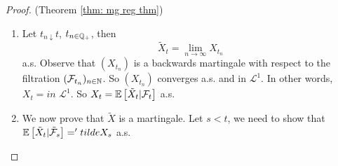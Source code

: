 \documentclass{article}
\begin{document}
\begin{proof}{(Theorem \ref{thm: mg reg thm})}
\begin{enumerate}
	 Let $ a<b$, $ a,b \in \Q_{+}$, $ I\subseteq \Q_{+}$, bounded. Observe that
	\[
		\mathcal{N}([a,b], I, X) = \displaystyle\sup_{I \subseteq I, J \text{ finite}} \mathcal{N}([a,b], J, X).
	\]
	Now, let $ J = \{j_{1}, \cdots, j_{n}\}\subseteq I$ with $ j_{1}<\cdots j_{n}$ and $ k>\displaystyle\sup I$. Then $ (X_{t})_{t\in J}$ is a discrete time martingale. Now, Doob's upcrossing inequality from \ref{lemma: doob upcrossing} gives
	\[
	\begin{array}{ll}
		(b-a)\cdot \mathbb{E}\left[ \mathcal{N}([a,b], J, X) \right] &\leq \mathbb{E}\left[ (X_{j_{n}}-a)^{-} \right] \\
	     &\leq \mathbb{E}\left[ (X_{k}-a)^{-} \right].
	\end{array}
	\]
	By monotone convergence, we get 
\[
(b-a)\cdot \mathbb{E}\left[ \mathcal{N}([a,b], I, X) \right]<\infty.
	\]
	Let $ M\in \N$, $ I_{M} = \Q_{+}\cap [0,M]$ and 
 \[
	 \Omega_{0} = \displaystyle\bigcap_{m\in\N} \left( \displaystyle\bigcap_{a<b, a,b\in\Q} \{ \mathcal{N}([a,b], I_{M}, X)<\infty\} \bigcup \left\{ \displaystyle\sup_{t\in I_{m}} |X_{t}|<\infty \right\}\right).
 \]
 On $ \Omega_{0}$, from lemma \ref{lemma: mg reg lemma}, $ \lim_{s \downarrow tX_{s}} $ exists and we have $\PP(\Omega_{0})=1$. Now, define 
 \[
	 \tilde{X}_{t} = \left\lbrace
\begin{array}{@{}l@{}}
	\lim_{s\downarrow t, s\in \Q_{+}} X_{s}, \quad \text{ on }\Omega_{0}    \\
	0 , \quad\quad\quad\quad\quad \text{ otherwise}. 
\end{array}\right. 
 \]
 Recall $ \tilde{\F}_{t} = \sigma(\F_{t}, \mathcal{N})$ for all $ t\geq 0$. From the definition definition, we see that $ \tilde{X}$ is $ \tilde{\F}-$adapted.\\ 

 It remains to show that $X_{t} =  \mathbb{E}\left[ \tilde{X}_{t}|\F_{t} \right]$ a.s. and $ \tilde{X}$ is cadlag and a martingale. 

\item Let $ t_{n\downarrow} t$, $ t_{n\in \mathbb{Q}_{+}}$, then 
	\[
		\tilde{X}_{t} = \lim_{n\to \infty}X_{t_{n}} 
	\]
	a.s. Observe that $ (X_{t_{n}})$ is a backwards martingale with respect to the filtration $ (\mathcal{F}_{t_{n}})_{n\in \mathbb{N}}$. So $ (X_{t_{n}})$ converges a.s. and in $ \mathcal{L}^{1} $. In other words, $ X_{t } = in $ $\mathcal{L}^{1} $. So $ X_{t} = \mathbb{E}\left[ \tilde{X}_{t}|\F_{t}\right]$ a.s.

\item We now prove that $ \tilde{X}$ is a martingale. Let $ s<t$, we need to show that $ \mathbb{E}\left[ \tilde{X}_{t}|\tilde{\mathcal{F}}_{s} \right] = 'tilde{X}_{s}$ a.s.\\ 


\end{enumerate}
\end{proof}
\end{document}
